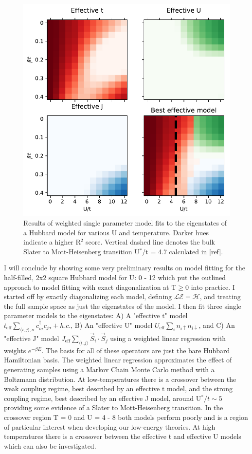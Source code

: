 \documentclass[12pt]{article}
\begin{document}
\begin{figure}[H]
\centering
\includegraphics[width=0.6\linewidth]{figs/eff_eig_prelim.pdf}
\caption{Results of weighted single parameter model fits to the eigenstates of a Hubbard model for various U and temperature. Darker hues indicate a higher R$^2$ score. Vertical dashed line denotes the bulk Slater to Mott-Heisenberg transition U$^*$/t = 4.7 calculated in [ref].}
\label{fig:Hubbard}
\end{figure}	

I will conclude by showing some very preliminary results on model fitting for the half-filled, 2x2 square Hubbard model for U: 0 - 12 which put the outlined approach to model fitting with exact diagonalization at T$\geq 0$ into practice.
I started off by exactly diagonalizing each model, defining $\mathcal{LE} = \mathcal{H}$, and treating the full sample space as just the eigenstates of the model.
I then fit three single parameter models to the eigenstates: A) 
A "effective t" model $t_\text{eff} \sum_{\langle i, j \rangle, \sigma} c_{i\sigma}^\dagger c_{j\sigma} + h.c.$, B) An "effective U" model $U_\text{eff} \sum_{i} n_{i\uparrow} n_{i\downarrow}$, and C) An "effective J" model $J_\text{eff} \sum_{\langle i,j \rangle} \vec{S}_i \cdot \vec{S}_j$ using a weighted linear regression with weights $e^{-\beta E}$.
The basis for all of these operators are just the bare Hubbard Hamiltonian basis.
The weighted linear regression approximates the effect of generating samples using a Markov Chain Monte Carlo method with a Boltzmann distribution.
At low-temperatures there is a crossover between the weak coupling regime, best described by an effective t model, and the strong coupling regime, best described by an effective J model, around U$^*/t \sim 5$ providing some evidence of a Slater to Mott-Heisenberg transition.
In the crossover region T = 0 and U = 4 - 8 both models perform poorly and is a region of particular interest when developing our low-energy theories.
At high temperatures there is a crossover between the effective t and effective U models which can also be investigated.
\end{document}
